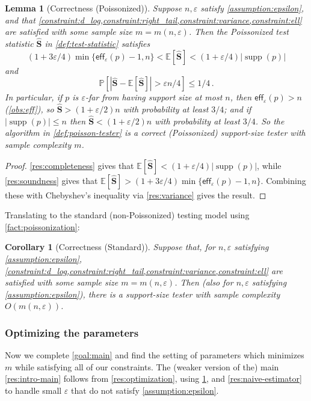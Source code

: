 \documentclass[10pt,a4paper]{article}
\newtheorem{lemma}{Lemma}[section]
\newtheorem{corollary}{Corollary}[section]
\DeclareMathOperator{\supp}{supp}   %
\newcommand{\Ex}[1]{\bE \left[ #1 \right]}
\renewcommand{\Pr}[1]{\bP \left[ #1 \right]} %
\newcommand{\bE}{\ensuremath{\mathbb{E}}}
\newcommand{\bP}{\ensuremath{\mathbb{P}}}
\newcommand{\eff}{\mathsf{eff}}
\renewcommand{\epsilon}{\varepsilon}
\begin{document}
\begin{lemma}[Correctness (Poissonized)]
\label{res:poisson-correctness}
Suppose $n, \epsilon$ satisfy \cref{assumption:epsilon}, and that
\cref{constraint:d_log,constraint:right_tail,constraint:variance,constraint:ell} are satisfied with
some sample size $m = m(n,\epsilon)$. Then the Poissonized test statistic $\widehat{\bm S}$
in \cref{def:test-statistic} satisfies
\[
  (1+3\epsilon/4) \min\{ \eff_\epsilon(p)-1, n \} < \Ex{ \widehat{\bm S}} < (1+\epsilon/4)|\supp(p)|
\]
and
\[
  \Pr{ |\widehat{\bm S} - \Ex{\widehat{\bm S}}| > \epsilon n/4} \le 1/4 \,.
\]
In particular, if $p$ is $\epsilon$-far from having support size at most $n$, then $\eff_\epsilon(p)
> n$ (\cref{obs:eff}),
so $\widehat{\bm S} > (1+\epsilon/2)n$ with probability at least $3/4$; and if $|\supp(p)|
\leq n$ then $\widehat{\bm S} < (1+\epsilon/2)n$ with probability at least $3/4$. So the algorithm
in \cref{def:poisson-tester} is a correct (Poissonized) support-size tester with sample complexity
$m$.
\end{lemma}
\begin{proof}
    \cref{res:completeness} gives that $\Ex{\bm{\widehat S}} < (1 + \epsilon/4) |\supp(p)|$, while
\cref{res:soundness} gives that $\Ex{\bm{\widehat S}} > (1 + 3\epsilon/4) \min\{\eff_\epsilon(p)-1,
n\}$.  Combining these with Chebyshev's inequality via \cref{res:variance} gives the result.
\end{proof}

Translating to the standard (non-Poissonized) testing model using \cref{fact:poissonization}:

\begin{corollary}[Correctness (Standard)]
\label{res:correctness}
Suppose that, for $n, \epsilon$ satisfying \cref{assumption:epsilon},
\cref{constraint:d_log,constraint:right_tail,constraint:variance,constraint:ell} are satisfied with
some sample size $m = m(n,\epsilon)$. Then (also for $n, \epsilon$ satisfying
\cref{assumption:epsilon}), there is a support-size tester with sample complexity $O( m(n,\epsilon)
)$.
\end{corollary}

\subsubsection{Optimizing the parameters}
\label{section:optimizing}

Now we complete \cref{goal:main} and find the setting of parameters which minimizes $m$ while
satisfying all of our constraints. The (weaker version of the) main \cref{res:intro-main} follows
from \cref{res:optimization}, using \cref{res:correctness}, and \cref{res:naive-estimator} to handle
small $\epsilon$ that do not satisfy \cref{assumption:epsilon}.
\end{document}
